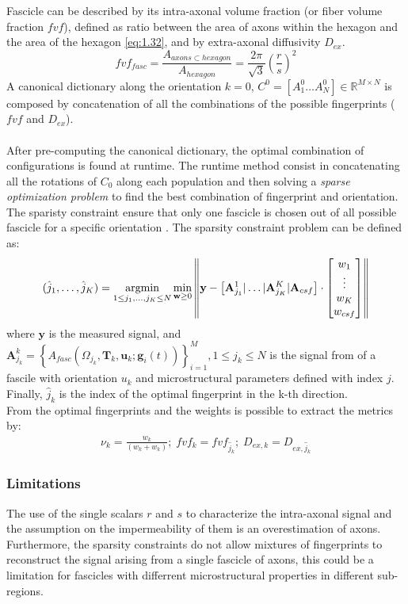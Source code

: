  \noindent Fascicle can be described by its intra-axonal volume fraction (or fiber volume fraction $fvf$), defined as ratio between the area of axons within the hexagon and the area of the hexagon \ref{eq:1.32}, and by extra-axonal diffusivity $D_{ex}$.
 \begin{equation}\label{eq:1.32}
   fvf_{fasc} = \frac{A_{axons \subset hexagon}}{A_{hexagon}} = \frac{2\pi}{\sqrt{3}} \left(\frac{r}{s}\right) ^ 2
 \end{equation}
 A canonical dictionary along the orientation $k=0$, $C^0 = \left[ A^0_1 \dots A^0_N \right] \in \mathbb{R}^{M \times N}$ is composed by concatenation of all the combinations of the possible fingerprints ($fvf$ and $D_{ex}$). \cite{dessain2022fast}
 \\\\
 After pre-computing the canonical dictionary, the optimal combination of configurations is found at runtime. The runtime method consist in concatenating all the rotations of $C_0$ along each population and then solving a \emph{sparse optimization problem} to find the best combination of fingerprint and orientation. The sparisty constraint ensure that only one fascicle is chosen out of all possible fascicle for a specific orientation \cite{rensonnet2019vivo}. The sparsity constraint problem can be defined as:
 \begin{equation}
   (\hat{j}_1, \dots, \hat{j}_K) = \mathop{\mathrm{argmin}}\limits_{1\leq j_1, \dots, j_K \leq N} \min_{\mathbf{w}\geq0} \left\lVert \mathbf{y} - \left[ \mathbf{A}^1_{j_1} | \dots | \mathbf{A}^K_{j_K} | \mathbf{A}_{csf} \right] \cdot \begin{bmatrix} w_1 \\ \vdots \\ w_K \\ w_{csf} \end{bmatrix} \right\rVert
 \end{equation}
 where $\mathbf{y}$ is the measured signal, and $\mathbf{A}^k_{j_k} = \left\{ A_{fasc} \left( \Omega_{j_k},\mathbf{T}_k, \mathbf{u}_k;\mathbf{g}_i(t)\right) \right\}^M_{i=1}, 1\leq j_k \leq N $ is the signal from of a fascile with orientation $u_k$ and microstructural parameters defined with index $j$. Finally, $\hat{j}_k$ is the index of the optimal fingerprint in the k-th direction.\\
 From the optimal fingerprints and the weights is possible to extract the metrics by:
 \begin{align*}
 \nu_k = \frac{w_k}{\left(w_k + w_k\right)}; \; fvf_k = fvf_{\hat{j}_k}; \; D_{ex, k} = D_{ex, \hat{j}_k}
 \end{align*}

  \subsubsection*{Limitations}
  The use of the single scalars $r$ and $s$ to characterize the intra-axonal signal and the assumption on the impermeability of them is an overestimation of axons. Furthermore, the sparsity constraints do not allow mixtures of fingerprints to reconstruct the signal arising from a single fascicle of axons, this could be a limitation for fascicles with differrent microstructural properties in different sub-regions. \cite{rensonnet2019vivo}
